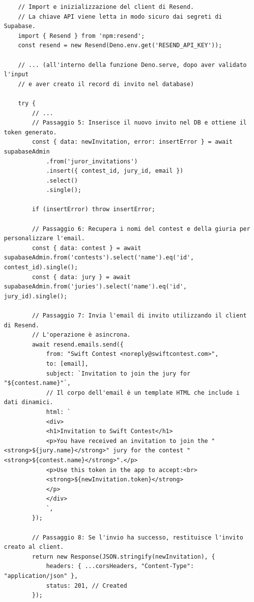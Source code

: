 \begin{longlisting}
    \begin{verbatim}
    // Import e inizializzazione del client di Resend.
    // La chiave API viene letta in modo sicuro dai segreti di Supabase.
    import { Resend } from 'npm:resend';
    const resend = new Resend(Deno.env.get('RESEND_API_KEY'));

    // ... (all'interno della funzione Deno.serve, dopo aver validato l'input
    // e aver creato il record di invito nel database)

    try {
        // ...
        // Passaggio 5: Inserisce il nuovo invito nel DB e ottiene il token generato.
        const { data: newInvitation, error: insertError } = await supabaseAdmin
            .from('juror_invitations')
            .insert({ contest_id, jury_id, email })
            .select()
            .single();

        if (insertError) throw insertError;

        // Passaggio 6: Recupera i nomi del contest e della giuria per personalizzare l'email.
        const { data: contest } = await supabaseAdmin.from('contests').select('name').eq('id', contest_id).single();
        const { data: jury } = await supabaseAdmin.from('juries').select('name').eq('id', jury_id).single();

        // Passaggio 7: Invia l'email di invito utilizzando il client di Resend.
        // L'operazione è asincrona.
        await resend.emails.send({
            from: "Swift Contest <noreply@swiftcontest.com>",
            to: [email],
            subject: `Invitation to join the jury for "${contest.name}"`,
            // Il corpo dell'email è un template HTML che include i dati dinamici.
            html: `
            <div>
            <h1>Invitation to Swift Contest</h1>
            <p>You have received an invitation to join the "<strong>${jury.name}</strong>" jury for the contest "<strong>${contest.name}</strong>".</p>
            <p>Use this token in the app to accept:<br>
            <strong>${newInvitation.token}</strong>
            </p>
            </div>
            `,
        });

        // Passaggio 8: Se l'invio ha successo, restituisce l'invito creato al client.
        return new Response(JSON.stringify(newInvitation), {
            headers: { ...corsHeaders, "Content-Type": "application/json" },
            status: 201, // Created
        });


\end{verbatim}
\end{longlisting}
